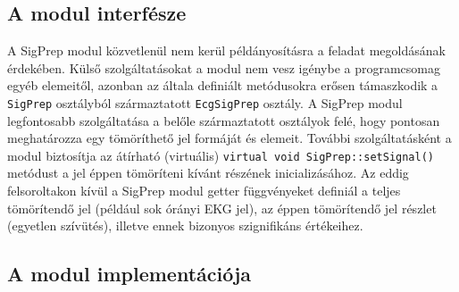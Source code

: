 \documentclass[oneside,titlepage,12pt,a4paper]{report}
\begin{document}
\subsection*{A modul interfésze}

\par A SigPrep modul közvetlenül nem kerül példányosításra a feladat megoldásának érdekében. Külső szolgáltatásokat a modul nem vesz igénybe a programcsomag egyéb elemeitől, azonban az általa definiált metódusokra erősen támaszkodik a \texttt{SigPrep} osztályból származtatott \texttt{EcgSigPrep} osztály. A SigPrep modul legfontosabb szolgáltatása a belőle származtatott osztályok felé, hogy pontosan meghatározza egy tömöríthető jel formáját és elemeit. További szolgáltatásként a modul biztosítja az átírható (virtuális) \texttt{virtual void SigPrep::setSignal()} metódust a jel éppen tömöríteni kívánt részének inicializásához. Az eddig felsoroltakon kívül a SigPrep modul getter függvényeket definiál a teljes tömörítendő jel (például sok órányi EKG jel), az éppen tömörítendő jel részlet (egyetlen szívütés), illetve ennek bizonyos szignifikáns értékeihez. 

\subsection*{A modul implementációja}
\end{document}
